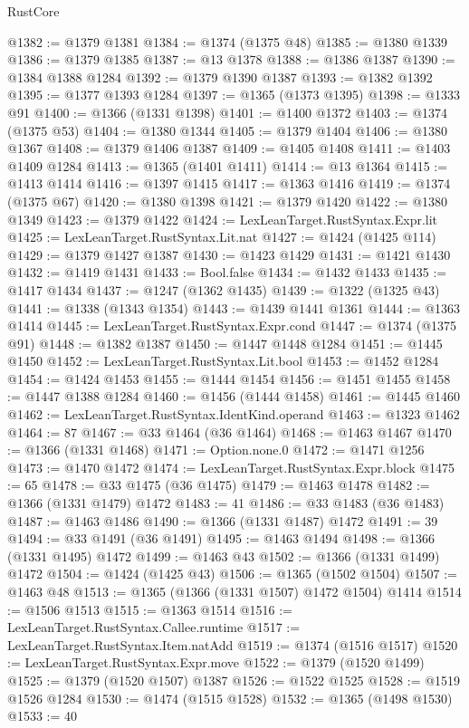 \begin{lexlean}{RustCore}
\begin{coremodule}
@1382 := @1379 @1381
@1384 := @1374 (@1375 @48)
@1385 := @1380 @1339
@1386 := @1379 @1385
@1387 := @13 @1378
@1388 := @1386 @1387
@1390 := @1384 @1388 @1284
@1392 := @1379 @1390 @1387
@1393 := @1382 @1392
@1395 := @1377 @1393 @1284
@1397 := @1365 (@1373 @1395)
@1398 := @1333 @91
@1400 := @1366 (@1331 @1398)
@1401 := @1400 @1372
@1403 := @1374 (@1375 @53)
@1404 := @1380 @1344
@1405 := @1379 @1404
@1406 := @1380 @1367
@1408 := @1379 @1406 @1387
@1409 := @1405 @1408
@1411 := @1403 @1409 @1284
@1413 := @1365 (@1401 @1411)
@1414 := @13 @1364
@1415 := @1413 @1414
@1416 := @1397 @1415
@1417 := @1363 @1416
@1419 := @1374 (@1375 @67)
@1420 := @1380 @1398
@1421 := @1379 @1420
@1422 := @1380 @1349
@1423 := @1379 @1422
@1424 := LexLeanTarget.RustSyntax.Expr.lit
@1425 := LexLeanTarget.RustSyntax.Lit.nat
@1427 := @1424 (@1425 @114)
@1429 := @1379 @1427 @1387
@1430 := @1423 @1429
@1431 := @1421 @1430
@1432 := @1419 @1431
@1433 := Bool.false
@1434 := @1432 @1433
@1435 := @1417 @1434
@1437 := @1247 (@1362 @1435)
@1439 := @1322 (@1325 @43)
@1441 := @1338 (@1343 @1354)
@1443 := @1439 @1441 @1361
@1444 := @1363 @1414
@1445 := LexLeanTarget.RustSyntax.Expr.cond
@1447 := @1374 (@1375 @91)
@1448 := @1382 @1387
@1450 := @1447 @1448 @1284
@1451 := @1445 @1450
@1452 := LexLeanTarget.RustSyntax.Lit.bool
@1453 := @1452 @1284
@1454 := @1424 @1453
@1455 := @1444 @1454
@1456 := @1451 @1455
@1458 := @1447 @1388 @1284
@1460 := @1456 (@1444 @1458)
@1461 := @1445 @1460
@1462 := LexLeanTarget.RustSyntax.IdentKind.operand
@1463 := @1323 @1462
@1464 := 87
@1467 := @33 @1464 (@36 @1464)
@1468 := @1463 @1467
@1470 := @1366 (@1331 @1468)
@1471 := Option.none.{0}
@1472 := @1471 @1256
@1473 := @1470 @1472
@1474 := LexLeanTarget.RustSyntax.Expr.block
@1475 := 65
@1478 := @33 @1475 (@36 @1475)
@1479 := @1463 @1478
@1482 := @1366 (@1331 @1479) @1472
@1483 := 41
@1486 := @33 @1483 (@36 @1483)
@1487 := @1463 @1486
@1490 := @1366 (@1331 @1487) @1472
@1491 := 39
@1494 := @33 @1491 (@36 @1491)
@1495 := @1463 @1494
@1498 := @1366 (@1331 @1495) @1472
@1499 := @1463 @43
@1502 := @1366 (@1331 @1499) @1472
@1504 := @1424 (@1425 @43)
@1506 := @1365 (@1502 @1504)
@1507 := @1463 @48
@1513 := @1365 (@1366 (@1331 @1507) @1472 @1504) @1414
@1514 := @1506 @1513
@1515 := @1363 @1514
@1516 := LexLeanTarget.RustSyntax.Callee.runtime
@1517 := LexLeanTarget.RustSyntax.Item.natAdd
@1519 := @1374 (@1516 @1517)
@1520 := LexLeanTarget.RustSyntax.Expr.move
@1522 := @1379 (@1520 @1499)
@1525 := @1379 (@1520 @1507) @1387
@1526 := @1522 @1525
@1528 := @1519 @1526 @1284
@1530 := @1474 (@1515 @1528)
@1532 := @1365 (@1498 @1530)
@1533 := 40

\end{coremodule}
\end{lexlean}
